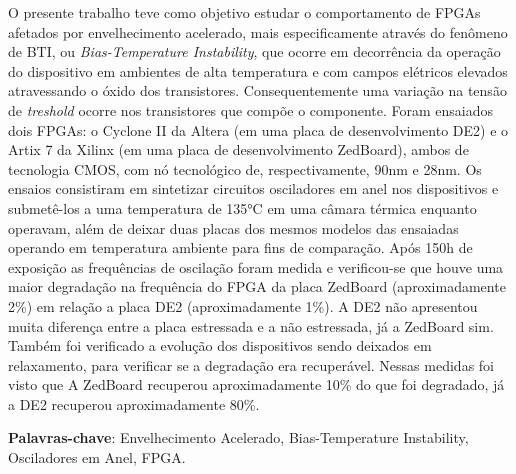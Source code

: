 \begin{resumo}[Resumo]
O presente trabalho teve como objetivo estudar o comportamento de FPGAs afetados por envelhecimento acelerado, mais especificamente através do fenômeno de BTI, ou \textit{Bias-Temperature Instability}, que ocorre em decorrência da operação do dispositivo em ambientes de alta temperatura e com campos elétricos elevados atravessando o óxido dos transistores. Consequentemente uma variação na tensão de \textit{treshold} ocorre nos transistores que compõe o componente. Foram ensaiados dois FPGAs: o Cyclone II da Altera (em uma placa de desenvolvimento DE2) e o Artix 7 da Xilinx (em uma placa de desenvolvimento ZedBoard), ambos de tecnologia CMOS, com nó tecnológico de, respectivamente, 90nm e 28nm. Os ensaios consistiram em sintetizar circuitos osciladores em anel nos dispositivos e submetê-los a uma temperatura de 135°C em uma câmara térmica enquanto operavam, além de deixar duas placas dos mesmos modelos das ensaiadas operando em temperatura ambiente para fins de comparação. Após 150h de exposição as frequências de oscilação foram medida e verificou-se que houve uma maior degradação na frequência do FPGA da placa ZedBoard (aproximadamente 2\%) em relação a placa DE2 (aproximadamente 1\%). A DE2 não apresentou muita diferença entre a placa estressada e a não estressada, já a ZedBoard sim. Também foi verificado a evolução dos dispositivos sendo deixados em relaxamento, para verificar se a degradação era recuperável. Nessas medidas foi visto que A ZedBoard recuperou aproximadamente 10\% do que foi degradado, já a DE2 recuperou aproximadamente 80\%.


    \vspace{\onelineskip}
	\noindent
        
	\textbf{Palavras-chave}: Envelhecimento Acelerado, Bias-Temperature Instability, Osciladores em Anel, FPGA.

\end{resumo}

\setlength{\absparsep}{18pt} 

